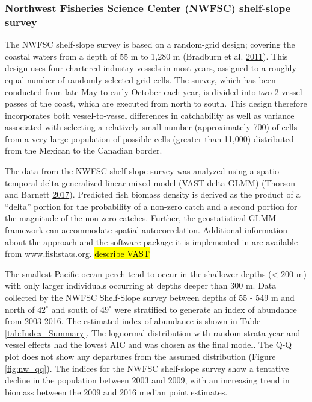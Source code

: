\documentclass[12pt,]{article}
\begin{document}
\subsubsection{Northwest Fisheries Science Center (NWFSC) shelf-slope
survey}\label{northwest-fisheries-science-center-nwfsc-shelf-slope-survey}

The NWFSC shelf-slope survey is based on a random-grid design; covering
the coastal waters from a depth of 55 m to 1,280 m (Bradburn et al.
\protect\hyperlink{ref-bradburn_2003_2011}{2011}). This design uses four
chartered industry vessels in most years, assigned to a roughly equal
number of randomly selected grid cells. The survey, which has been
conducted from late-May to early-October each year, is divided into two
2-vessel passes of the coast, which are executed from north to south.
This design therefore incorporates both vessel-to-vessel differences in
catchability as well as variance associated with selecting a relatively
small number (approximately 700) of cells from a very large population
of possible cells (greater than 11,000) distributed from the Mexican to
the Canadian border.

The data from the NWFSC shelf-slope survey was analyzed using a
spatio-temporal delta-generalized linear mixed model (VAST delta-GLMM)
(Thorson and Barnett
\protect\hyperlink{ref-thorson_comparing_2017}{2017}). Predicted fish
biomass density is derived as the product of a ``delta'' portion for the
probability of a non-zero catch and a second portion for the magnitude
of the non-zero catches. Further, the geostatistical GLMM framework can
accommodate spatial autocorrelation. Additional information about the
approach and the software package it is implemented in are available
from www.fishstats.org. \hl{describe VAST}

The smallest Pacific ocean perch tend to occur in the shallower depths
(\textless{} 200 m) with only larger individuals occurring at depths
deeper than 300 m. Data collected by the NWFSC Shelf-Slope survey
between depths of 55 - 549 m and north of \(42^\circ\) and south of
\(49^\circ\) were stratified to generate an index of abundance from
2003-2016. The estimated index of abundance is shown in Table
\ref{tab:Index_Summary}. The lognormal distribution with random
strata-year and vessel effects had the lowest AIC and was chosen as the
final model. The Q-Q plot does not show any departures from the assumed
distribution (Figure \ref{fig:nw_qq}). The indices for the NWFSC
shelf-slope survey show a tentative decline in the population between
2003 and 2009, with an increasing trend in biomass between the 2009 and
2016 median point estimates.
\end{document}

